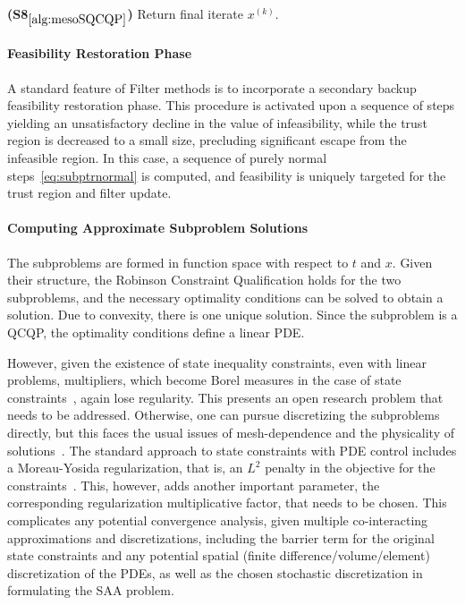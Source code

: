 \documentclass{article}
\newcommand{\1}{\mathds{1}}          %
\theoremstyle{definition}
\begin{document}
\begin{sloppypar}
\begin{algorithm}[H]
\begin{algorithmic}
\EndWhile

\Statex \textbf{(S8$_{\ref{alg:mesoSQCQP}}$)}  
Return final iterate $x^{(k)}$.

\end{algorithmic}
\end{algorithm}




\paragraph{Feasibility Restoration Phase}

A standard feature of Filter methods is to incorporate a secondary backup feasibility restoration phase. This procedure is activated upon a sequence of steps yielding an unsatisfactory decline in the value of infeasibility, while the trust region is decreased to a small size, precluding significant escape from the infeasible region. In this case, a sequence of purely normal steps~\eqref{eq:subptrnormal} is computed, and feasibility is uniquely targeted for the trust region and filter update. 



\paragraph{Computing Approximate Subproblem Solutions}

The subproblems are formed in function space with respect to $t$ and $x$. Given their structure, the Robinson Constraint Qualification holds for the two subproblems, and the necessary optimality conditions can be solved to obtain a solution. Due to convexity, there is one unique solution. Since the subproblem is a QCQP, the optimality conditions define a linear PDE. 

However, given the existence of state inequality constraints, even with linear problems, multipliers, which become Borel measures in the case of state constraints~\cite{hinze2009optimization}, again lose regularity. This presents an open research problem that needs to be addressed. Otherwise, one can pursue discretizing the subproblems directly, but this faces the usual issues of mesh-dependence and the physicality of solutions~\cite{schwedes2017mesh}. The standard approach to state constraints with PDE control includes a Moreau-Yosida regularization, that is, an $L^2$ penalty in the objective for the constraints~\cite{hintermuller2010pde}. This, however, adds another important parameter, the corresponding regularization multiplicative factor, that needs to be chosen. This complicates any potential convergence analysis, given multiple co-interacting approximations and discretizations, including the barrier term for the original state constraints and any potential spatial (finite difference/volume/element) discretization of the PDEs, as well as the chosen stochastic discretization in formulating the SAA problem. 




\end{sloppypar}
\end{document}
